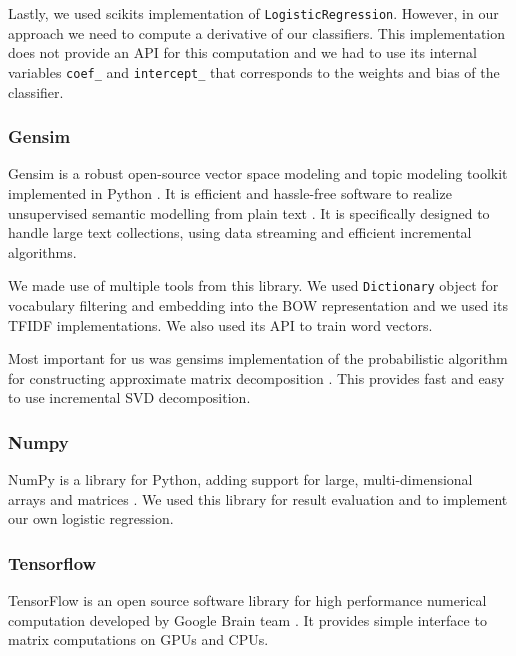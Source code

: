     Lastly, we used scikits implementation of \texttt{LogisticRegression}.
    However, in our approach we need to compute a derivative of our classifiers. 
    This implementation does not provide an API for this computation and we had to use
    its internal variables \texttt{coef\_} and \texttt{intercept\_} that corresponds to the weights and bias of the classifier.
    
    \subsubsection{Gensim}
    
    Gensim is a robust open-source vector space modeling and topic modeling toolkit implemented in Python \cite{rehurek_lrec}. 
    It is efficient and hassle-free software to realize unsupervised semantic modelling from plain text \cite{bird2009natural}. %
    It is specifically designed to handle large text collections, using data streaming and efficient incremental algorithms. 
    
    We made use of multiple tools from this library. 
    We used \texttt{Dictionary} object for vocabulary filtering and embedding into the BOW representation and we used its TFIDF implementations.
    We also used its API to train word vectors. \* %
    
    Most important for us was gensims implementation of the probabilistic algorithm for constructing approximate matrix decomposition \cite{halko2011finding}.
    This provides fast and easy to use incremental SVD decomposition.
    
    \subsubsection{Numpy}
    
    NumPy is a library for Python, adding support for large, multi-dimensional arrays and matrices \cite{oliphant2006guide}. %
    We used this library for result evaluation and to implement our own logistic regression.
    
    \subsubsection{Tensorflow}
    
    TensorFlow is an open source software library for high performance numerical computation developed by Google Brain team \cite{tensorflow2015-whitepaper}. 
    It provides simple interface to matrix computations on GPUs and CPUs.
    
